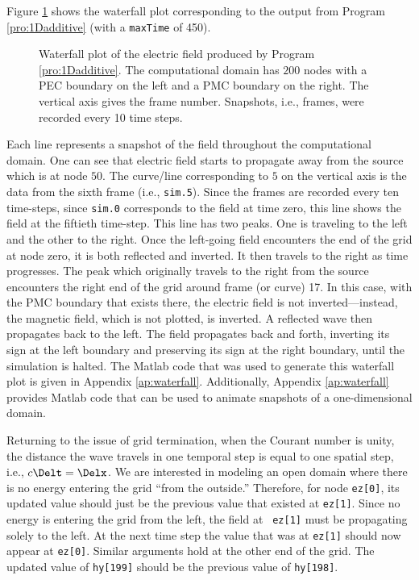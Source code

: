 Figure \ref{fig:waterfall} shows the waterfall plot corresponding to
the output from Program \ref{pro:1Dadditive} (with a {\tt maxTime} of
450).
\begin{figure}
  \begin{center}
  \end{center}
  \caption{Waterfall plot of the electric field produced by Program
    \ref{pro:1Dadditive}.  The computational domain has $200$ nodes
    with a PEC boundary on the left and a PMC boundary on the right.
    The vertical axis gives the frame number.  Snapshots, i.e.,
    frames, were recorded every 10 time steps.}
  \label{fig:waterfall} 
\end{figure}
Each line represents a snapshot of the field throughout the
computational domain.  One can see that electric field starts to
propagate away from the source which is at node $50$.  The curve/line
corresponding to $5$ on the vertical axis is the data from the sixth
frame (i.e., {\tt sim.5}).  Since the frames are recorded every ten
time-steps, since {\tt sim.0} corresponds to the field at time zero,
this line shows the field at the fiftieth time-step.  This line has
two peaks.  One is traveling to the left and the other to the right.
Once the left-going field encounters the end of the grid at node zero,
it is both reflected and inverted.  It then travels to the right as
time progresses.  The peak which originally travels to the right from
the source encounters the right end of the grid around frame (or
curve) 17.  In this case, with the PMC boundary that exists there, the
electric field is not inverted---instead, the magnetic field, which is
not plotted, is inverted.  A reflected wave then propagates back to
the left.  The field propagates back and forth, inverting its sign at
the left boundary and preserving its sign at the right boundary, until
the simulation is halted.  The Matlab code that was used to generate
this waterfall plot is given in Appendix \ref{ap:waterfall}.
Additionally, Appendix \ref{ap:waterfall} provides Matlab code that
can be used to animate snapshots of a one-dimensional domain.

Returning to the issue of grid termination, when the Courant number is
unity, the distance the wave travels in one temporal step is equal to
one spatial step, i.e., $c\Delt = \Delx$.  We are interested in
modeling an open domain where there is no energy entering the grid
``from the outside.''  Therefore, for node {\tt ez[0]}, its updated
value should just be the previous value that existed at {\tt ez[1]}.
Since no energy is entering the grid from the left, the field at {\tt
ez[1]} must be propagating solely to the left.  At the next time step
the value that was at {\tt ez[1]} should now appear at {\tt ez[0]}.
Similar arguments hold at the other end of the grid.  The updated
value of {\tt hy[199]} should be the previous value of {\tt hy[198]}.

